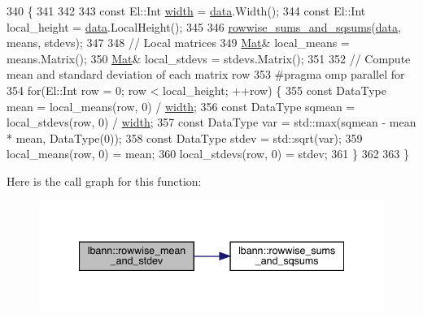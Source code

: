 \begin{DoxyCode}
340                                                 \{
341 
342   
343   \textcolor{keyword}{const} El::Int \hyperlink{structlayer__header_af1f45c9c74db048ea424114418f22d50}{width} = \hyperlink{namespacelbann_1_1cnpy__utils_a9ac86d96ccb1f8b4b2ea16441738781f}{data}.Width();
344   \textcolor{keyword}{const} El::Int local\_height = \hyperlink{namespacelbann_1_1cnpy__utils_a9ac86d96ccb1f8b4b2ea16441738781f}{data}.LocalHeight();
345 
346   \hyperlink{namespacelbann_a6b342b3e5b3fbb08b97b6d90aa68d121}{rowwise\_sums\_and\_sqsums}(\hyperlink{namespacelbann_1_1cnpy__utils_a9ac86d96ccb1f8b4b2ea16441738781f}{data}, means, stdevs);
347   
348   \textcolor{comment}{// Local matrices}
349   \hyperlink{base_8hpp_a68f11fdc31b62516cb310831bbe54d73}{Mat}& local\_means = means.Matrix();
350   \hyperlink{base_8hpp_a68f11fdc31b62516cb310831bbe54d73}{Mat}& local\_stdevs = stdevs.Matrix();
351   
352   \textcolor{comment}{// Compute mean and standard deviation of each matrix row}
353 \textcolor{preprocessor}{  #pragma omp parallel for}
354   \textcolor{keywordflow}{for}(El::Int row = 0; row < local\_height; ++row) \{
355     \textcolor{keyword}{const} DataType mean = local\_means(row, 0) / \hyperlink{structlayer__header_af1f45c9c74db048ea424114418f22d50}{width};
356     \textcolor{keyword}{const} DataType sqmean = local\_stdevs(row, 0) / \hyperlink{structlayer__header_af1f45c9c74db048ea424114418f22d50}{width};
357     \textcolor{keyword}{const} DataType var = std::max(sqmean - mean * mean, DataType(0));
358     \textcolor{keyword}{const} DataType stdev = std::sqrt(var);
359     local\_means(row, 0) = mean;
360     local\_stdevs(row, 0) = stdev;
361   \}
362 
363 \}
\end{DoxyCode}
Here is the call graph for this function\+:\nopagebreak
\begin{figure}[H]
\begin{center}
\leavevmode
\includegraphics[width=340pt]{namespacelbann_a9b1fd2f864f421aa0bd9f8582ad87c14_cgraph}
\end{center}
\end{figure}
\mbox{\label{namespacelbann_a6b342b3e5b3fbb08b97b6d90aa68d121}} 
